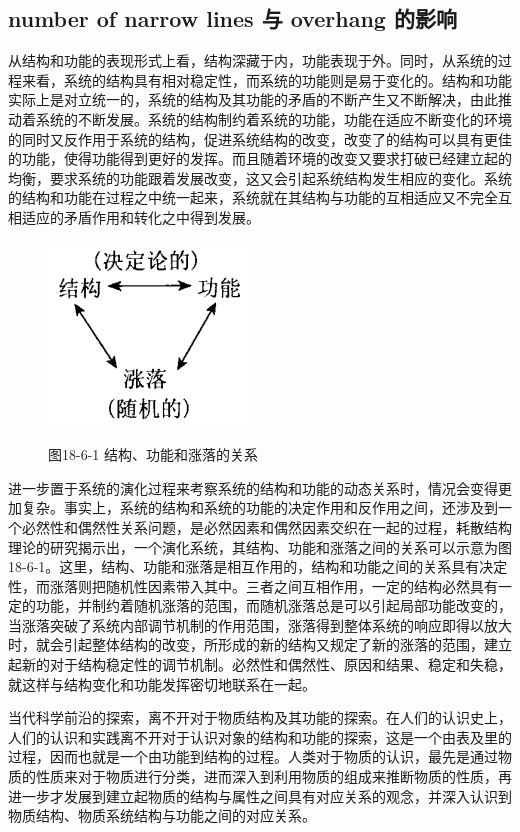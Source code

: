 \documentclass{article}
\begin{document}
\subsection{number of narrow lines 与 overhang 的影响}
从结构和功能的表现形式上看，结构深藏于内，功能表现于外。同时，从系统的过程来看，系统的结构具有相对稳定性，而系统的功能则是易于变化的。结构和功能实际上是对立统一的，系统的结构及其功能的矛盾的不断产生又不断解决，由此推动着系统的不断发展。系统的结构制约着系统的功能，功能在适应不断变化的环境的同时又反作用于系统的结构，促进系统结构的改变，改变了的结构可以具有更佳的功能，使得功能得到更好的发挥。而且随着环境的改变又要求打破已经建立起的均衡，要求系统的功能跟着发展改变，这又会引起系统结构发生相应的变化。系统的结构和功能在过程之中统一起来，系统就在其结构与功能的互相适应又不完全互相适应的矛盾作用和转化之中得到发展。

\begin{figure}
  \begin{center}
    \includegraphics[width=.3\textwidth]{figure1.png}

    图18-6-1 结构、功能和涨落的关系
  \end{center}
\end{figure}

进一步置于系统的演化过程来考察系统的结构和功能的动态关系时，情况会变得更加复杂。事实上，系统的结构和系统的功能的决定作用和反作用之间，还涉及到一个必然性和偶然性关系问题，是必然因素和偶然因素交织在一起的过程，耗散结构理论的研究揭示出，一个演化系统，其结构、功能和涨落之间的关系可以示意为图18-6-1。这里，结构、功能和涨落是相互作用的，结构和功能之间的关系具有决定性，而涨落则把随机性因素带入其中。三者之间互相作用，一定的结构必然具有一定的功能，并制约着随机涨落的范围，而随机涨落总是可以引起局部功能改变的，当涨落突破了系统内部调节机制的作用范围，涨落得到整体系统的响应即得以放大时，就会引起整体结构的改变，所形成的新的结构又规定了新的涨落的范围，建立起新的对于结构稳定性的调节机制。必然性和偶然性、原因和结果、稳定和失稳，就这样与结构变化和功能发挥密切地联系在一起。

当代科学前沿的探索，离不开对于物质结构及其功能的探索。在人们的认识史上，人们的认识和实践离不开对于认识对象的结构和功能的探索，这是一个由表及里的过程，因而也就是一个由功能到结构的过程。人类对于物质的认识，最先是通过物质的性质来对于物质进行分类，进而深入到利用物质的组成来推断物质的性质，再进一步才发展到建立起物质的结构与属性之间具有对应关系的观念，并深入认识到物质结构、物质系统结构与功能之间的对应关系。
\end{document}

